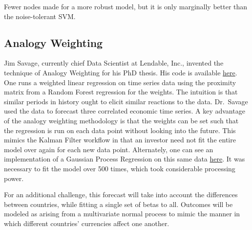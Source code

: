 \documentclass[]{article}
\begin{document}
Fewer nodes made for a more robust model, but it is only marginally
better than the noise-tolerant SVM.

\subsection{Analogy Weighting}\label{analogy-weighting}

Jim Savage, currently chief Data Scientist at Lendable, Inc., invented
the technique of Analogy Weighting for his PhD thesis. His code is
available \href{https://github.com/khakieconomics/Thesis_work}{here}.
One runs a weighted linear regression on time series data using the
proximity matrix from a Random Forest regression for the weights. The
intuition is that similar periods in history ought to elicit similar
reactions to the data. Dr.~Savage used the data to forecast three
correlated economic time series. A key advantage of the analogy
weighting methodology is that the weights can be set such that the
regression is run on each data point without looking into the future.
This mimics the Kalman Filter workflow in that an investor need not fit
the entire model over again for each new data point. Alternately, one
can see an implementation of a Gaussian Process Regression on this same
data \href{https://charlesnaylor.github.io/gp_regression/}{here}. It was
necessary to fit the model over 500 times, which took considerable
processing power.

For an additional challenge, this forecast will take into account the
differences between countries, while fitting a single set of betas to
all. Outcomes will be modeled as arising from a multivariate normal
process to mimic the manner in which different countries' currencies
affect one another.
\end{document}

